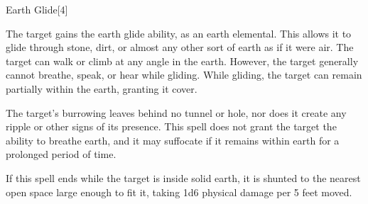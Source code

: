 \begin{spellsection}{Earth Glide}[4]
    \begin{spellheader}
    \end{spellheader}
    \begin{spellcontent}
        \begin{spelltargetinginfo}
        \end{spelltargetinginfo}
        \begin{spelleffects}
            \spelleffect The target gains the earth glide ability, as an earth elemental. This allows it to glide through stone, dirt, or almost any other sort of earth as if it were air. The target can walk or climb at any angle in the earth. However, the target generally cannot breathe, speak, or hear while gliding. While gliding, the target can remain partially within the earth, granting it cover.
            \spelldur \durshort
        \end{spelleffects}
    \end{spellcontent}
    \begin{spellfooter}
        \spellnotes The target's burrowing leaves behind no tunnel or hole, nor does it create any ripple or other signs of its presence.
        This spell does not grant the target the ability to breathe earth, and it may suffocate if it remains within earth for a prolonged period of time.

        If this spell ends while the target is inside solid earth, it is shunted to the nearest open space large enough to fit it, taking 1d6 physical damage per 5 feet moved.
        \miscastexplode
    \end{spellfooter}
    \begin{spellaugments}
    \end{spellaugments}
\end{spellsection}

